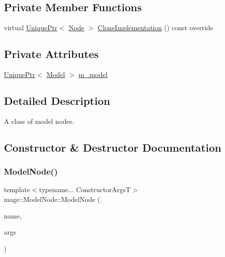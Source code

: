 \subsection*{Private Member Functions}
\begin{DoxyCompactItemize}
\item 
virtual \hyperlink{namespacemage_a3316d7143a973e37adf1110f2e80ca31}{Unique\+Ptr}$<$ \hyperlink{classmage_1_1_node}{Node} $>$ \hyperlink{classmage_1_1_model_node_a34146201083015276b38240af307417f}{Clone\+Implementation} () const override
\end{DoxyCompactItemize}
\subsection*{Private Attributes}
\begin{DoxyCompactItemize}
\item 
\hyperlink{namespacemage_a3316d7143a973e37adf1110f2e80ca31}{Unique\+Ptr}$<$ \hyperlink{classmage_1_1_model}{Model} $>$ \hyperlink{classmage_1_1_model_node_a784faf19f736a1c74808321ed0e52d36}{m\+\_\+model}
\end{DoxyCompactItemize}


\subsection{Detailed Description}
A class of model nodes. 

\subsection{Constructor \& Destructor Documentation}
\hypertarget{classmage_1_1_model_node_ab8d77a4792224d8909fb399393b8294f}{}\label{classmage_1_1_model_node_ab8d77a4792224d8909fb399393b8294f} 
\subsubsection{\texorpdfstring{Model\+Node()}{ModelNode()}\hspace{0.1cm}{\footnotesize\ttfamily [1/4]}}
{\footnotesize\ttfamily template$<$typename... Constructor\+ArgsT$>$ \\
mage\+::\+Model\+Node\+::\+Model\+Node (\begin{DoxyParamCaption}\item[{const string \&}]{name,  }\item[{Constructor\+ArgsT \&\&...}]{args }\end{DoxyParamCaption})\hspace{0.3cm}{\ttfamily [explicit]}}

